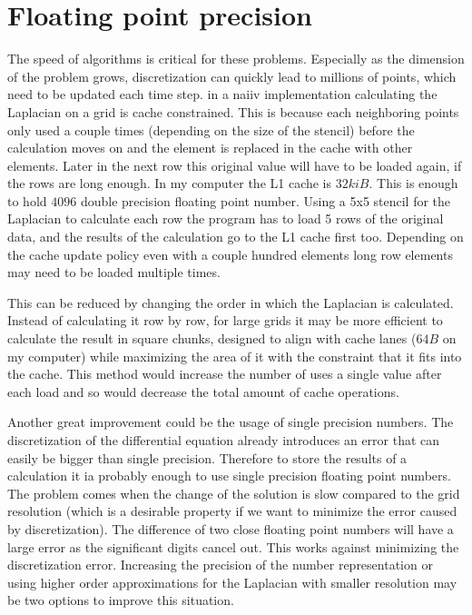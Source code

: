 \documentclass[pdftex,12pt,a4paper]{article}
\begin{document}
	\section{Floating point precision}
		The speed of algorithms is critical for these problems. Especially as the dimension of the problem grows, discretization can quickly lead to millions of points, which need to be updated each time step. in a naiiv implementation calculating the Laplacian on a grid is cache constrained. This is because each neighboring points only used a couple times (depending on the size of the stencil) before the calculation moves on and the element is replaced in the cache with other elements. Later in the next row this original value will have to be loaded again, if the rows are long enough. In my computer the L1 cache is $32kiB$. This is enough to hold $4096$ double precision floating point number. Using a 5x5 stencil for the Laplacian to calculate each row the program has to load 5 rows of the original data, and the results of the calculation go to the L1 cache first too. Depending on the cache update policy even with a couple hundred elements long row elements may need to be loaded multiple times.
		
		This can be reduced by changing the order in which the Laplacian is calculated. Instead of calculating it row by row, for large grids it may be more efficient to calculate the result in square chunks, designed to align with cache lanes ($64B$ on my computer) while maximizing the area of it with the constraint that it fits into the cache. This method would increase the number of uses a single value after each load and so would decrease the total amount of cache operations.
		
		Another great improvement could be the usage of single precision numbers. The discretization of the differential equation already introduces an error that can easily be bigger than single precision. Therefore to store the results of a calculation it ia probably enough to use single precision floating point numbers. The problem comes when the change of the solution is slow compared to the grid resolution (which is a desirable property if we want to minimize the error caused by discretization). The difference of two close floating point numbers will have a large error as the significant digits cancel out. This works against minimizing the discretization error. Increasing the precision of the number representation or using higher order approximations for the Laplacian with smaller resolution may be two options to improve this situation.
\end{document}
